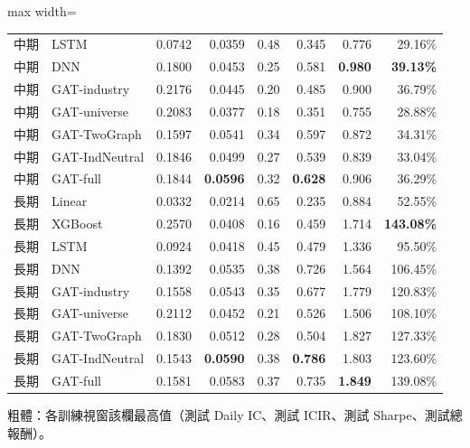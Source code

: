 \begin{table}[H]
\begin{adjustbox}{max width=\textwidth}
\begin{tabular}{@{}llrrrrrr@{}}
中期 & LSTM           & 0.0742 & 0.0359 &         0.48 &         0.345 &          0.776  &   29.16\% \\
中期 & DNN            & 0.1800 & 0.0453 &         0.25 &         0.581 & \textbf{0.980}  & \textbf{39.13\%} \\
中期 & GAT-industry   & 0.2176 & 0.0445 &         0.20 &         0.485 &          0.900  &   36.79\% \\
中期 & GAT-universe   & 0.2083 & 0.0377 &         0.18 &         0.351 &          0.755  &   28.88\% \\
中期 & GAT-TwoGraph   & 0.1597 & 0.0541 &         0.34 &         0.597 &          0.872  &   34.31\% \\
中期 & GAT-IndNeutral & 0.1846 & 0.0499 &         0.27 &         0.539 &          0.839  &   33.04\% \\
中期 & GAT-full       & 0.1844 & \textbf{0.0596} & 0.32 & \textbf{0.628} &       0.906  &   36.29\% \\
\midrule
長期 & Linear           & 0.0332 & 0.0214 &         0.65 &         0.235 &          0.884  &   52.55\% \\
長期 & XGBoost          & 0.2570 & 0.0408 &         0.16 &         0.459 &          1.714  & \textbf{143.08\%} \\
長期 & LSTM             & 0.0924 & 0.0418 &         0.45 &         0.479 &          1.336  &   95.50\% \\
長期 & DNN              & 0.1392 & 0.0535 &         0.38 &         0.726 &          1.564  &  106.45\% \\
長期 & GAT-industry     & 0.1558 & 0.0543 &         0.35 &         0.677 &          1.779  &  120.83\% \\
長期 & GAT-universe     & 0.2112 & 0.0452 &         0.21 &         0.526 &          1.506  &  108.10\% \\
長期 & GAT-TwoGraph     & 0.1830 & 0.0512 &         0.28 &         0.504 &          1.827  &  127.33\% \\
長期 & GAT-IndNeutral   & 0.1543 & \textbf{0.0590} & 0.38 & \textbf{0.786} &       1.803  &  123.60\% \\
長期 & GAT-full         & 0.1581 & 0.0583 &         0.37 &         0.735 & \textbf{1.849}  &  139.08\% \\
\bottomrule
\end{tabular}
\end{adjustbox}
\smallskip

{\footnotesize 粗體：各訓練視窗該欄最高值（測試 Daily IC、測試 ICIR、測試 Sharpe、測試總報酬）。}
\renewcommand{\arraystretch}{1.0}
\endgroup
\end{table}
